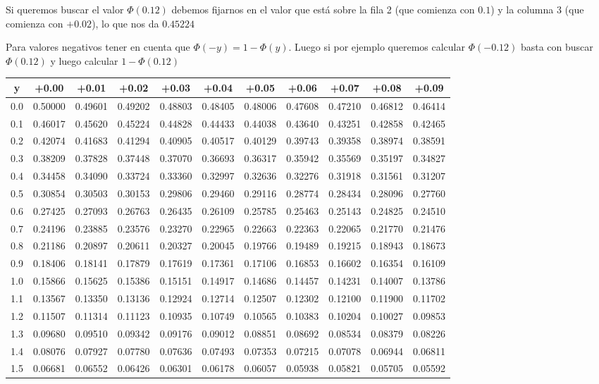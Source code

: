 \documentclass[]{book}
\theoremstyle{plain}
\theoremstyle{definition}
\theoremstyle{definition} %
\begin{document}
Si queremos buscar el valor \(\Phi(0.12)\) debemos fijarnos en el valor
que está sobre la fila 2 (que comienza con \(0.1\)) y la columna 3 (que
comienza con \(+0.02\)), lo que nos da \(0.45224\)

Para valores negativos tener en cuenta que \(\Phi(-y) = 1-\Phi(y)\).
Luego si por ejemplo queremos calcular \(\Phi(-0.12)\) basta con buscar
\(\Phi(0.12)\) y luego calcular \(1-\Phi(0.12)\)\\

\begin{longtable}[]{@{}ccccccccccc@{}}
\toprule
y & +0.00 & +0.01 & +0.02 & +0.03 & +0.04 & +0.05 & +0.06 & +0.07 &
+0.08 & +0.09\tabularnewline
\midrule
\endhead
0.0 & 0.50000 & 0.49601 & 0.49202 & 0.48803 & 0.48405 & 0.48006 &
0.47608 & 0.47210 & 0.46812 & 0.46414\tabularnewline
0.1 & 0.46017 & 0.45620 & 0.45224 & 0.44828 & 0.44433 & 0.44038 &
0.43640 & 0.43251 & 0.42858 & 0.42465\tabularnewline
0.2 & 0.42074 & 0.41683 & 0.41294 & 0.40905 & 0.40517 & 0.40129 &
0.39743 & 0.39358 & 0.38974 & 0.38591\tabularnewline
0.3 & 0.38209 & 0.37828 & 0.37448 & 0.37070 & 0.36693 & 0.36317 &
0.35942 & 0.35569 & 0.35197 & 0.34827\tabularnewline
0.4 & 0.34458 & 0.34090 & 0.33724 & 0.33360 & 0.32997 & 0.32636 &
0.32276 & 0.31918 & 0.31561 & 0.31207\tabularnewline
0.5 & 0.30854 & 0.30503 & 0.30153 & 0.29806 & 0.29460 & 0.29116 &
0.28774 & 0.28434 & 0.28096 & 0.27760\tabularnewline
0.6 & 0.27425 & 0.27093 & 0.26763 & 0.26435 & 0.26109 & 0.25785 &
0.25463 & 0.25143 & 0.24825 & 0.24510\tabularnewline
0.7 & 0.24196 & 0.23885 & 0.23576 & 0.23270 & 0.22965 & 0.22663 &
0.22363 & 0.22065 & 0.21770 & 0.21476\tabularnewline
0.8 & 0.21186 & 0.20897 & 0.20611 & 0.20327 & 0.20045 & 0.19766 &
0.19489 & 0.19215 & 0.18943 & 0.18673\tabularnewline
0.9 & 0.18406 & 0.18141 & 0.17879 & 0.17619 & 0.17361 & 0.17106 &
0.16853 & 0.16602 & 0.16354 & 0.16109\tabularnewline
1.0 & 0.15866 & 0.15625 & 0.15386 & 0.15151 & 0.14917 & 0.14686 &
0.14457 & 0.14231 & 0.14007 & 0.13786\tabularnewline
1.1 & 0.13567 & 0.13350 & 0.13136 & 0.12924 & 0.12714 & 0.12507 &
0.12302 & 0.12100 & 0.11900 & 0.11702\tabularnewline
1.2 & 0.11507 & 0.11314 & 0.11123 & 0.10935 & 0.10749 & 0.10565 &
0.10383 & 0.10204 & 0.10027 & 0.09853\tabularnewline
1.3 & 0.09680 & 0.09510 & 0.09342 & 0.09176 & 0.09012 & 0.08851 &
0.08692 & 0.08534 & 0.08379 & 0.08226\tabularnewline
1.4 & 0.08076 & 0.07927 & 0.07780 & 0.07636 & 0.07493 & 0.07353 &
0.07215 & 0.07078 & 0.06944 & 0.06811\tabularnewline
1.5 & 0.06681 & 0.06552 & 0.06426 & 0.06301 & 0.06178 & 0.06057 &
0.05938 & 0.05821 & 0.05705 & 0.05592\tabularnewline

\end{longtable}
\end{document}
